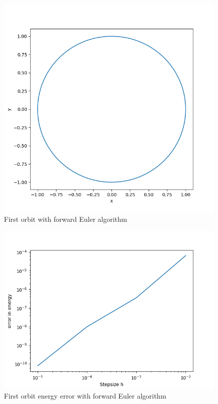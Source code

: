 \documentclass[11pt, a4paper, reqno]{scrartcl}
\begin{document}
    		\begin{figure}[H]
    			\includegraphics[width=.5\paperwidth]{figure_1.png}
    			\caption{First orbit with forward Euler algorithm}
    		\end{figure}
    		
    		\begin{figure}[H]
    			\includegraphics[width=.5\paperwidth]{figure_1_2.png}
    			\caption{First orbit energy error with forward Euler algorithm}
    		\end{figure}
    		
\end{document}
